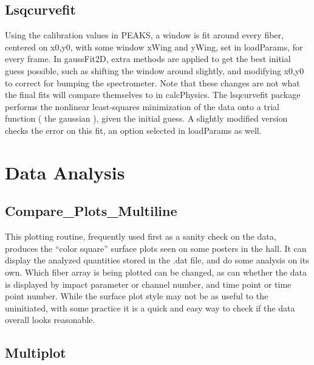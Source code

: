 \documentclass[twoside]{article}
\begin{document}
\subsection{Lsqcurvefit}
\hspace{4ex}Using the calibration values in PEAKS, a window is fit around every fiber, centered on x0,y0, with some window xWing and yWing, set in loadParams, for every frame. In gaussFit2D, extra methods are applied to get the best initial guess possible, such as shifting the window around slightly, and modifying x0,y0 to correct for bumping the spectrometer. Note that these changes are not what the final fits will compare themselves to in calcPhysics. The lsqcurvefit package performs the nonlinear least-squares minimization of the data onto a trial function ( the gaussian ), given the initial guess. A slightly modified version checks the error on this fit, an option selected in loadParams as well.


\section{Data Analysis}
\subsection{Compare\_Plots\_Multiline}
\hspace{4ex}This plotting routine, frequently used first as a sanity check on the data, produces the “color square” surface plots seen on some posters in the hall. It can display the analyzed quantities stored in the .dat file, and do some analysis on its own. Which fiber array is being plotted can be changed, as can whether the data is displayed by impact parameter or channel number, and time point or time point number. While the surface plot style may not be as useful to the uninitiated, with some practice it is a quick and easy way to check if the data overall looks reasonable. 
\subsection{Multiplot}
\end{document}
